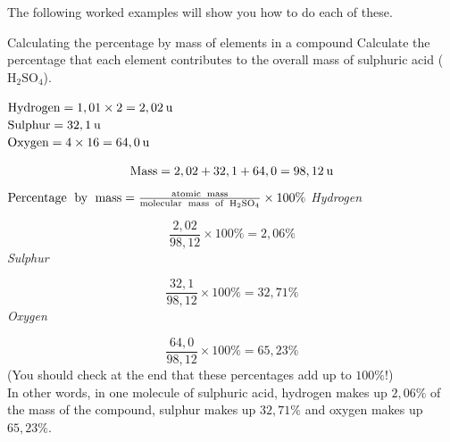 The following worked examples will show you how to do each of these.
\par
            \label{m38712*secfhsst!!!underscore!!!id901}\vspace{.5cm} 
      \noindent
      \begin{wex}{Calculating the percentage by mass of elements in a compound }
{
      \label{m38712*probfhsst!!!underscore!!!id902}
      \label{m38712*id280520}Calculate the percentage that each element contributes to the overall mass of sulphuric acid (${\text{H}}_{2}{\text{SO}}_{4}$).
      \vspace{5pt}}
{
      \label{m38712*id280575}$\text{Hydrogen}=1,01\ensuremath{\times}2=2,02\phantom{\rule{2pt}{0ex}}\text{u}$ \\ 
      \label{m38712*id280588}$\text{Sulphur}=32,1\phantom{\rule{2pt}{0ex}}\text{u}$ \\
      \label{m38712*id280591}$\text{Oxygen}=4\ensuremath{\times}16=64,0\phantom{\rule{2pt}{0ex}}\text{u}$
      \label{m38712*id280629}\nopagebreak\noindent{}
        
    \begin{equation*}
    \text{Mass}=2,02 + 32,1 + 64,0 =98,12\phantom{\rule{2pt}{0ex}}\text{u}
      \end{equation*}
      \label{m38712*id280688}$\text{Percentage\; by\; mass}=\frac{\text{atomic\; mass}}{\text{molecular\; mass\; of\; H}{}_{2}\text{SO}{}_{4}}\ensuremath{\times}100\%$ 
      \label{m38712*id280729}
        \textsl{Hydrogen}
      
      \label{m38712*id280735}\nopagebreak\noindent{}
        
    \begin{equation*}
    \frac{2,02}{98,12}\ensuremath{\times}100\%=2,06\%
      \end{equation*}
      \label{m38712*id280780}
        \textsl{Sulphur}
      
      \label{m38712*id280786}\nopagebreak\noindent{}
        
    \begin{equation*}
    \frac{32,1}{98,12}\ensuremath{\times}100\%=32,71\%
      \end{equation*}
      \label{m38712*id280831}
        \textsl{Oxygen}
      
      \label{m38712*id280837}\nopagebreak\noindent{}
        
    \begin{equation*}
    \frac{64,0}{98,12}\ensuremath{\times}100\%=65,23\%
      \end{equation*}
      \label{m38712*id280876}(You should check at the end that these percentages add up to $100\%$!) \\
      \label{m38712*id280880}In other words, in one molecule of sulphuric acid, hydrogen makes up $2,06\%$ of the mass of the compound, sulphur makes up $32,71\%$ and oxygen makes up $65,23\%$. 
}
    \end{wex}
